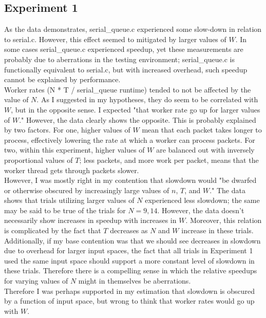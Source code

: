 \documentclass[]{article}
\begin{document}
\subsection{Experiment 1}
As the data demonstrates, serial\_queue.c experienced some slow-down in relation to serial.c. However, this effect seemed to mitigated by larger values of $W$. In some cases serial\_queue.c experienced speedup, yet these measurements are probably due to aberrations in the testing environment; serial\_queue.c is functionally equivalent to serial.c, but with increased overhead, such speedup cannot be explained by performance.
\\
Worker rates (N * T / serial\_queue runtime) tended to not be affected by the value of $N$. As I suggested in my hypotheses, they do seem to be correlated with $W$, but in the opposite sense. I expected "that worker rate go up for larger values of $W$." However, the data clearly shows the opposite. This is probably explained by two factors. For one, higher values of $W$ mean that each packet takes longer to process, effectively lowering the rate at which a worker can process packets. For two, within this experiment, higher values of $W$ are balanced out with inversely proportional values of $T$; less packets, and more work per packet, means that the worker thread gets through packets slower.
\\
However, I was mostly right in my contention that slowdown would "be dwarfed or otherwise obscured by increasingly large values of $n$, $T$, and $W$." The data shows that trials utilizing larger values of $N$ experienced less slowdown; the same may be said to be true of the trials for $N = 9, 14$. However, the data doesn't necessarily show increases in speedup with increases in $W$. Moreover, this relation is complicated by the fact that $T$ decreases as $N$ and $W$ increase in these trials.
\\
Additionally, if my base contention was that we should see decreases in slowdown due to overhead for larger input spaces, the fact that all trials in Experiment 1 used the same input space should support a more constant level of slowdown in these trials. Therefore there is a compelling sense in which the relative speedups for varying values of $N$ might in themselves be aberrations. 
\\
Therefore I was perhaps supported in my estimation that slowdown is obscured by a function of input space, but wrong to think that worker rates would go up with $W$. 
\end{document}
